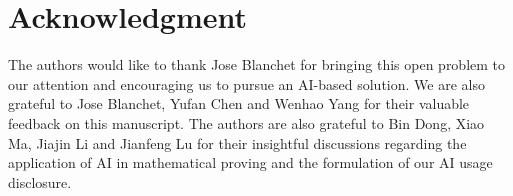\documentclass[aihp]{imsart}
\numberwithin{equation}{section}
\theoremstyle{plain}
\theoremstyle{definition}
\newcommand{\1}{\mathbf 1}
\begin{document}

\section*{Acknowledgment}

The authors would like to thank Jose Blanchet for bringing this open problem to our attention and encouraging us to pursue an AI-based solution. We are also grateful to Jose Blanchet, Yufan Chen and Wenhao Yang for their valuable feedback on this manuscript. The authors are also grateful to Bin Dong, Xiao Ma, Jiajin Li and Jianfeng Lu for their insightful discussions regarding the application of AI in mathematical proving and the formulation of our AI usage disclosure.
\end{document}
